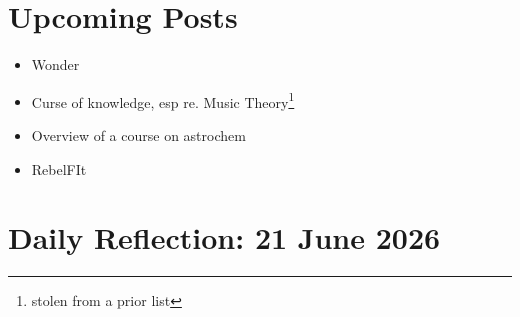 \documentclass[12pt]{article}
\renewcommand{\,}{\textsuperscript{,}}
\begin{document}
\section{Upcoming Posts}  
\begin{itemize}

\item Wonder  
\item Curse of knowledge, esp re. Music Theory\footnote{stolen from a prior list}  
\item Overview of a course on astrochem  
\item RebelFIt

\end{itemize}

\section{Daily Reflection: 21 June 2026}  
\end{document}
